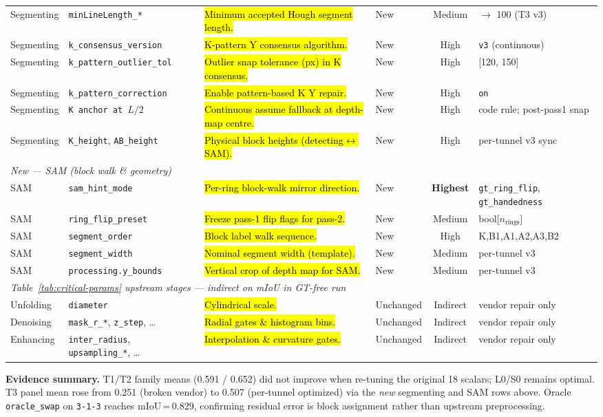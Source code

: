 \begin{table}[t]
\begin{tabular*}{\textwidth}{@{\extracolsep{\fill}} l l p{} l c l @{}}
Segmenting & \texttt{minLineLength\_*} & \hl{Minimum accepted Hough segment length.} & New & Medium & $\rightarrow$ 100 (T3 v3) \\
Segmenting & \texttt{k\_consensus\_version} & \hl{K-pattern Y consensus algorithm.} & New & High & \texttt{v3} (continuous) \\
Segmenting & \texttt{k\_pattern\_outlier\_tol} & \hl{Outlier snap tolerance (px) in K consensus.} & New & High & [120, 150] \\
Segmenting & \texttt{k\_pattern\_correction} & \hl{Enable pattern-based K Y repair.} & New & High & \texttt{on} \\
Segmenting & \texttt{K anchor at $L/2$} & \hl{Continuous assume fallback at depth-map centre.} & New & High & code rule; post-pass1 snap \\
Segmenting & \texttt{K\_height}, \texttt{AB\_height} & \hl{Physical block heights (detecting$\leftrightarrow$SAM).} & New & High & per-tunnel v3 sync \\
\midrule
\multicolumn{6}{l}{\textit{New --- SAM (block walk \& geometry)}} \\
\midrule
SAM & \texttt{sam\_hint\_mode} & \hl{Per-ring block-walk mirror direction.} & New & \textbf{Highest} & \texttt{gt\_ring\_flip}, \texttt{gt\_handedness} \\
SAM & \texttt{ring\_flip\_preset} & \hl{Freeze pass-1 flip flags for pass-2.} & New & Medium & bool[$n_{\text{rings}}$] \\
SAM & \texttt{segment\_order} & \hl{Block label walk sequence.} & New & High & K,B1,A1,A2,A3,B2 \\
SAM & \texttt{segment\_width} & \hl{Nominal segment width (template).} & New & Medium & per-tunnel v3 \\
SAM & \texttt{processing.y\_bounds} & \hl{Vertical crop of depth map for SAM.} & New & Medium & per-tunnel v3 \\
\midrule
\multicolumn{6}{l}{\textit{Table~\ref{tab:critical-params} upstream stages --- indirect on mIoU in GT-free run}} \\
\midrule
Unfolding & \texttt{diameter} & \hl{Cylindrical scale.} & Unchanged & Indirect & vendor repair only \\
Denoising & \texttt{mask\_r\_*}, \texttt{z\_step}, \ldots & \hl{Radial gates \& histogram bins.} & Unchanged & Indirect & vendor repair only \\
Enhancing & \texttt{inter\_radius}, \texttt{upsampling\_*}, \ldots & \hl{Interpolation \& curvature gates.} & Unchanged & Indirect & vendor repair only \\
\bottomrule
\end{tabular*}
\end{table}

\noindent\textbf{Evidence summary.} T1/T2 family means (0.591 / 0.652) did not improve when re-tuning the original 18 scalars; L0/S0 remains optimal. T3 panel mean rose from 0.251 (broken vendor) to 0.507 (per-tunnel optimized) via the \emph{new} segmenting and SAM rows above. Oracle \texttt{oracle\_swap} on \texttt{3-1-3} reaches mIoU\,=\,0.829, confirming residual error is block assignment rather than upstream preprocessing.
